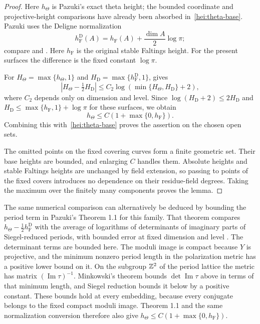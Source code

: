 \begin{proof}
Here $h_\Theta$ is Pazuki's exact theta height; the bounded coordinate
and projective-height comparisons have already been absorbed
in~\eqref{hei:theta-base}.  Pazuki uses the Deligne normalization
\[
 h_{\mathrm F}^{\mathrm D}(A)
   =h_{\mathrm F}(A)+\frac{\dim A}{2}\log\pi;
\]
compare \cite[Section 2.2]{Pazuki2012} and
\cite[Section 2.3]{GaudronRemondPeriods2014}.  Here $h_{\mathrm F}$
is the original stable Faltings height.  For the present surfaces
the difference is the fixed constant $\log\pi$.

For $H_\Theta=\max\{h_\Theta,1\}$ and
$H_{\mathrm D}=\max\{h_{\mathrm F}^{\mathrm D},1\}$,
\cite[Corollary 1.3(2)]{Pazuki2012} gives
\[
 |H_\Theta-\tfrac12H_{\mathrm D}|
 \le C_2\log(\min\{H_\Theta,H_{\mathrm D}\}+2),
\]
where $C_2$ depends only on dimension and level.  Since
$\log(H_{\mathrm D}+2)\le2H_{\mathrm D}$ and
$H_{\mathrm D}\le\max\{h_{\mathrm F},1\}+\log\pi$ for these surfaces,
we obtain
\[
 h_\Theta\le C(1+\max\{0,h_{\mathrm F}\}).
\]
Combining this with~\eqref{hei:theta-base} proves the assertion on the
chosen open sets.

The omitted points on the fixed covering curves form a finite
geometric set.  Their base heights are bounded, and enlarging $C$
handles them.  Absolute heights and stable Faltings heights are
unchanged by field extension, so passing to points of the fixed
covers introduces no dependence on their residue-field degrees.
Taking the maximum over the finitely many components proves the lemma.
\end{proof}

\begin{remark}
The same numerical comparison can alternatively be deduced by bounding
the period term in Pazuki's Theorem 1.1 for this family.  That theorem compares
$h_\Theta-\tfrac12h_{\mathrm F}^{\mathrm D}$ with the average of
logarithms of determinants of imaginary parts of Siegel-reduced
periods, with bounded error at fixed dimension and level
\cite{Pazuki2012}.  The determinant terms are bounded here.
The moduli image is compact because $Y$ is projective, and the
minimum nonzero period length in the polarization metric has a
positive lower bound on it.  On the subgroup $\mathbb Z^2$ of the period
lattice the metric has matrix $(\operatorname{Im}\tau)^{-1}$.
Minkowski's theorem bounds $\det\operatorname{Im}\tau$ above in terms
of that minimum length, and Siegel reduction bounds it below by a
positive constant.  These bounds hold at every embedding, because
every conjugate belongs to the fixed compact moduli image.  Theorem 1.1
and the same normalization conversion therefore also give
$h_\Theta\le C(1+\max\{0,h_{\mathrm F}\})$.
\end{remark}

